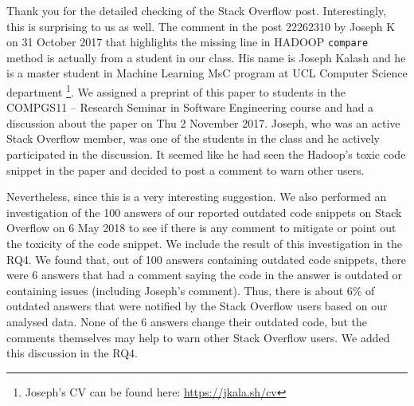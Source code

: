 \documentclass[a4paper,twoside,10pt]{reviewresponse}
\begin{document}

Thank you for the detailed checking of the Stack Overflow post. Interestingly, this is surprising to us as well. The comment in the post 22262310 by Joseph K on 31 October 2017 that highlights the missing line in HADOOP \texttt{compare} method is actually from a student in our class. His name is Joseph Kalash and he is a master student in Machine Learning MsC program at UCL Computer Science department \footnote{Joseph's CV can be found here: \url{https://jkala.sh/cv}}. We assigned a preprint of this paper to students in the COMPGS11 -- Research Seminar in Software Engineering course and had a discussion about the paper on Thu 2 November 2017. Joseph, who was an active Stack Overflow member, was one of the students in the class and he actively participated in the discussion. It seemed like he had seen the Hadoop's toxic code snippet in the paper and decided to post a comment to warn other users.

Nevertheless, since this is a very interesting suggestion. We also performed an investigation of the 100 answers of our reported outdated code snippets on Stack Overflow on 6 May 2018 to see if there is any comment to mitigate or point out the toxicity of the code snippet. We include the result of this investigation in the RQ4. We found that, out of 100 answers containing outdated code snippets, there were 6 answers that had a comment saying the code in the answer is outdated or containing issues (including Joseph's comment). Thus, there is about 6\% of outdated answers that were notified by the Stack Overflow users based on our analysed data. None of the 6 answers change their outdated code, but the comments themselves may help to warn other Stack Overflow users. We added this discussion in the RQ4.

\end{document}
